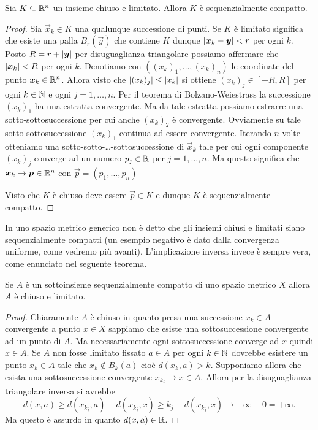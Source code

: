 \begin{theorem}[compattezza in $\RR^n$]%
  \label{th:compattezza_Rn}%
Sia $K\subseteq {\mathbb R}^n$ un insieme chiuso e limitato. 
Allora $K$ è sequenzialmente compatto.
\end{theorem}
\begin{proof}
Sia $\vec x_k\in K$ una qualunque successione di punti. 
Se $K$ è limitato significa che esiste una palla $B_r(\vec y)$ 
che contiene $K$ dunque ${\left|\boldsymbol x_k - \boldsymbol y\right|} < r$ per ogni $k$.
Posto $R=r+{\left|\boldsymbol y\right|}$ per disuguaglianza triangolare possiamo affermare 
che ${\left|\boldsymbol x_k\right|} < R$ per ogni $k$. 
Denotiamo con $((x_k)_1, \dots, (x_k)_n)$ le coordinate 
del punto $\boldsymbol x_k\in {\mathbb R}^n$. 
Allora visto che ${\left|(x_k)_j\right|}\le {\left|x_k\right|}$ si ottiene $(x_k)_j\in [-R,R]$
per ogni $k\in{\mathbb N}$ e ogni $j=1,\dots, n$.
Per il teorema di Bolzano-Weiestrass la successione $(x_k)_1$ ha una estratta 
convergente. Ma da tale estratta possiamo estrarre una sotto-sottosuccessione 
per cui anche $(x_k)_2$ è convergente. 
Ovviamente su tale sotto-sottosuccessione $(x_k)_1$ continua ad essere convergente.
Iterando $n$ volte otteniamo una sotto-sotto-\dots-sottosuccessione di $\vec x_k$ 
tale per cui ogni componente $(x_k)_j$ converge ad un numero $p_j\in {\mathbb R}$
per $j=1,\dots, n$.
Ma questo significa che $\boldsymbol x_k \to \boldsymbol p \in {\mathbb R}^n$ con $\vec p = (p_1,\dots, p_n)$

Visto che $K$ è chiuso deve essere $\vec p\in K$ e dunque $K$ è sequenzialmente compatto.
\end{proof}

In uno spazio metrico generico non è detto che gli insiemi chiusi e limitati 
siano sequenzialmente compatti (un esempio negativo è dato dalla convergenza uniforme, come
vedremo più avanti). 
L'implicazione inversa invece è sempre vera, come enunciato nel
seguente teorema.

\begin{theorem}%
\mymark{**}%
Se $A$ è un sottoinsieme sequenzialmente compatto 
di uno spazio metrico $X$
allora $A$ è chiuso e limitato.
\end{theorem}
%
\begin{proof}
Chiaramente $A$ è chiuso in quanto presa una successione $x_k\in A$ convergente a punto $x\in X$
sappiamo che esiste una sottosuccessione convergente ad un punto di $A$. Ma necessariamente ogni sottosuccessione converge ad $x$ quindi $x\in A$. Se $A$ non fosse limitato
fissato $a\in A$ per ogni $k\in {\mathbb N}$ dovrebbe esistere un punto $x_k\in A$ tale che $x_k \not\in B_k(a)$
cioè $d(x_k,a) > k$. Supponiamo allora che esista una sottosuccessione convergente $x_{k_j}\to x \in A$. Allora per la disuguaglianza triangolare inversa si avrebbe
\[
  d(x, a) \ge d(x_{k_j}, a) - d(x_{k_j},x)
   \ge k_j - d(x_{k_j},x) \to +\infty - 0 = +\infty.
\]
Ma questo è assurdo in quanto $d(x,a)\in {\mathbb R}$.
\end{proof}

